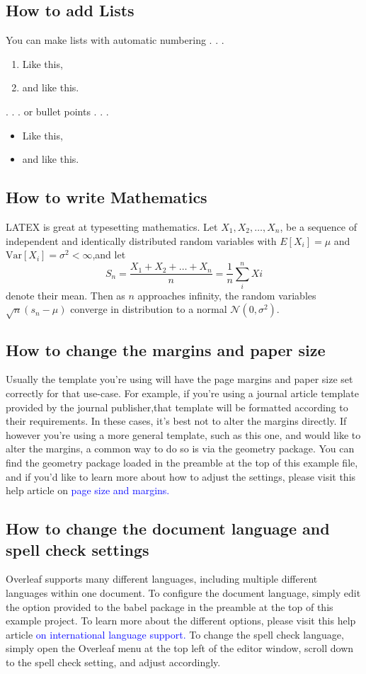 \documentclass{article}
\begin{document}
{\subsection{How to add Lists}
You can make lists with automatic numbering . . .
\begin{enumerate}
\item Like this,
\item and like this.
\end{enumerate}
. . . or bullet points . . . 
\begin{itemize}
\item Like this,
\item and like this. 	
\end{itemize} 


\subsection{How to write Mathematics}
LATEX is great at typesetting mathematics. Let  $X_1, X_2, \ldots, X_n$, be a sequence of independent and identically distributed random variables with $E[X_i] = \mu$ and $\text{Var}[X_i] = \sigma^2 < \infty$,and let 
\[
S_n=\frac{X_1+X_2+ \ldots + X_n}{n} =\frac{1}{n} \sum_{i}^{n}  Xi 
\]
denote their mean. Then as $n$ approaches infinity, the random variables 
$\sqrt{n}(s_n - \mu)$ converge in distribution to a normal $\mathcal{N}(0, \sigma^2)$.
 \subsection{How to change the margins and paper size}
	Usually the template you’re using will have the page margins and paper size set correctly for that  use-case. For example, if you’re using a journal article template provided by the journal publisher,that template will be formatted according to their requirements. In these cases, it’s best not to alter the margins directly.
    If however you’re using a more general template, such as this one, and would like to alter the margins, a common way to do so is via the geometry package. You can find the geometry package loaded in the preamble at the top of this example file, and if you’d like to learn more about how to adjust the settings, please visit  this help article on \textcolor{blue}{page size and margins.}
\newpage
\subsection{How to change the document language and spell check settings}	
	Overleaf supports many different languages, including multiple different languages within one document.
   To configure the document language, simply edit the option provided to the babel package in the preamble at the top of this example project. To learn more about the different options, please visit this help article \textcolor{blue}{ on international language support.}
  To change the spell check language, simply open the Overleaf menu at the top left of the editor	window, scroll down to the spell check setting, and adjust accordingly.
}
\end{document}
